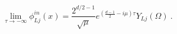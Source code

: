 \begin{equation}\label{inlim}
\lim_{\tau\rightarrow -\infty}\phi^{in}_{Lj}
(x)=
\frac{2^{d/2-1}}{\sqrt{\mu}}
e^{(\frac{d-1}{2}-i\mu)\tau}Y_{Lj}(\Omega) \ .
\end{equation}

